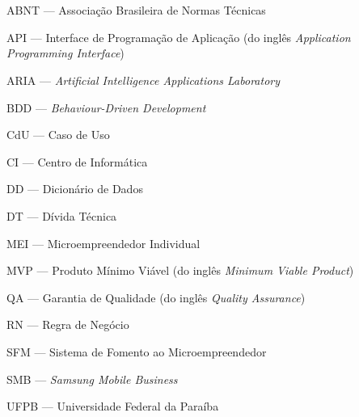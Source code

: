 \section*{} 

ABNT --- Associação Brasileira de Normas Técnicas

API --- Interface de Programação de Aplicação (do inglês \textit{Application Programming Interface})

ARIA --- \textit{Artificial Intelligence Applications Laboratory}

BDD --- \textit{Behaviour-Driven Development}

CdU --- Caso de Uso

CI --- Centro de Informática

DD --- Dicionário de Dados

DT --- Dívida Técnica 

MEI --- Microempreendedor Individual

MVP	--- Produto Mínimo Viável (do inglês \textit{Minimum Viable Product})

QA --- Garantia de Qualidade (do inglês \textit{Quality Assurance})

RN --- Regra de Negócio

SFM --- Sistema de Fomento ao Microempreendedor

SMB --- \textit{Samsung Mobile Business}

UFPB --- Universidade Federal da Paraíba